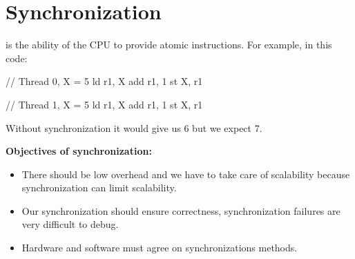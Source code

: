 \section{Synchronization}
\begin{tcolorbox}[vert]
     is the ability of the CPU to provide atomic instructions. For example, in this code:

    \vspace{1em}
    \begin{minipage}{0.48\textwidth}
        \begin{codeCenter}
        \begin{Ccode}
// Thread 0, X = 5
ld r1, X
add r1, 1
st X, r1          
        \end{Ccode}
        \end{codeCenter}
    \end{minipage}
    \begin{minipage}{0.48\textwidth}
        \begin{codeCenter}
        \begin{Ccode}
// Thread 1, X = 5
ld r1, X
add r1, 1
st X, r1                  
        \end{Ccode}
        \end{codeCenter}
    \end{minipage}
    Without synchronization it would give us 6 but we expect 7.
\end{tcolorbox}
    \textbf{Objectives of synchronization:}
    \begin{itemize}[left=10pt, label=\textbullet]
        \item There should be low overhead and we have to take care of scalability because synchronization can limit scalability.
        \item Our synchronization should ensure correctness, synchronization failures are very difficult to debug.
        \item Hardware and software must agree on synchronizations methods.
    \end{itemize}
    
